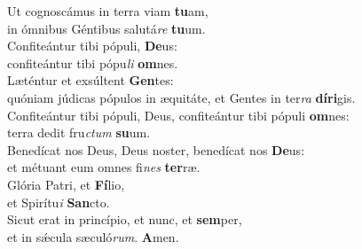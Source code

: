 \evenverse Ut cognoscámus in terra viam \textbf{tu}am,~\*\\
\evenverse in ómnibus Géntibus salutá\textit{re} \textbf{tu}um.\\
\oddverse Confiteántur tibi pópuli, \textbf{De}us:~\*\\
\oddverse confiteántur tibi pópu\textit{li} \textbf{om}nes.\\
\evenverse Læténtur et exsúltent \textbf{Gen}tes:~\*\\
\evenverse quóniam júdicas pópulos in æquitáte, et Gentes in ter\textit{ra} \textbf{dí}\textbf{ri}gis.\\
\oddverse Confiteántur tibi pópuli, Deus, confiteántur tibi pópuli \textbf{om}nes:~\*\\
\oddverse terra dedit fru\textit{ctum} \textbf{su}um.\\
\evenverse Benedícat nos Deus, Deus noster, benedícat nos \textbf{De}us:~\*\\
\evenverse et métuant eum omnes fi\textit{nes} \textbf{ter}ræ.\\
\oddverse Glória Patri, et \textbf{Fí}lio,~\*\\
\oddverse et Spirítu\textit{i} \textbf{San}cto.\\
\evenverse Sicut erat in princípio, et nunc, et \textbf{sem}per,~\*\\
\evenverse et in sǽcula sæculó\textit{rum}. \textbf{A}men.\\

